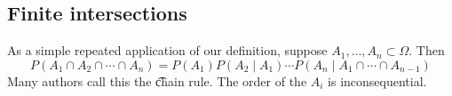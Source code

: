 \subsection*{Finite intersections}

As a simple repeated application of our definition, suppose $A_1, \dots , A_n \subset \Omega $.
Then
\[
P(A_1 \cap  A_2 \cap  \cdots \cap  A_n) = P(A_1) P(A_2 \mid A_1) \cdots P(A_n \mid  A_1 \cap  \cdots \cap  A_{n-1})
\]
Many authors call this the \t{chain rule}. The order of the $A_i$ is inconsequential.
